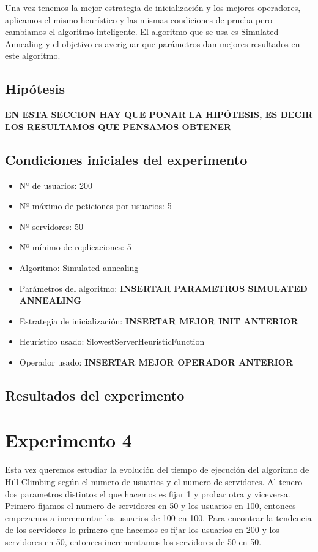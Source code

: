 \documentclass[a4paper,10pt]{report}
\begin{document}
		Una vez tenemos la mejor estrategia de inicialización y los mejores operadores, aplicamos el mismo heurístico y las mismas condiciones de prueba pero cambiamos el algoritmo inteligente. El algoritmo que se usa es Simulated Annealing y el objetivo es averiguar que parámetros dan mejores resultados en este algoritmo.\newline
		
		\section*{Hipótesis}
		\textbf{EN ESTA SECCION HAY QUE PONAR LA HIPÓTESIS, ES DECIR LOS RESULTAMOS QUE PENSAMOS OBTENER}
		
		\section*{Condiciones iniciales del experimento}
		\begin{itemize}
		    \item Nº de usuarios: 200
    		\item Nº máximo de peticiones por usuarios: 5
    		\item Nº servidores: 50
    		\item Nº mínimo de replicaciones: 5
    		\item Algoritmo: Simulated annealing
    		\item Parámetros del algoritmo: \textbf{INSERTAR PARAMETROS SIMULATED ANNEALING}
    		\item Estrategia de inicialización: \textbf{INSERTAR MEJOR INIT ANTERIOR}
    		\item Heurístico usado: SlowestServerHeuristicFunction
    		\item Operador usado: \textbf{INSERTAR MEJOR OPERADOR ANTERIOR}
		\end{itemize}

		\section*{Resultados del experimento}
		
		
	\chapter*{Experimento 4}

		Esta vez queremos estudiar la evolución del tiempo de ejecución del algoritmo de Hill Climbing según el numero de usuarios y el numero de servidores. Al tenero dos parametros distintos el que hacemos es fijar 1 y probar otra y viceversa. Primero fijamos el numero de servidores en 50 y los usuarios en 100, entonces empezamos a incrementar los usuarios de 100 en 100. Para encontrar la tendencia de los servidores lo primero que hacemos es fijar los usuarios en 200 y los servidores en 50, entonces incrementamos los servidores de 50 en 50.\newline
		
\end{document}
